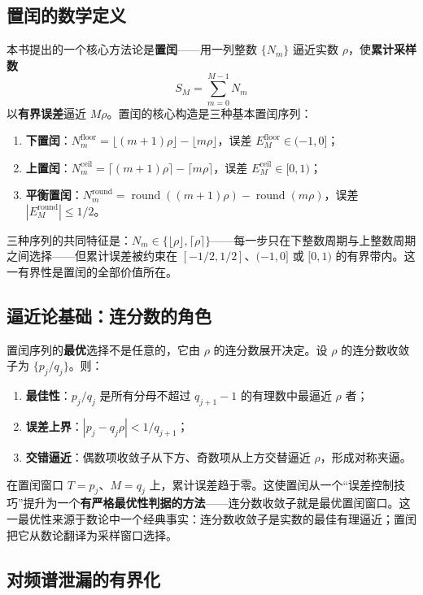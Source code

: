 \subsection*{置闰的数学定义}

本书提出的一个核心方法论是\textbf{置闰}——用一列整数 $\{N_m\}$ 逼近实数 $\rho$，使\textbf{累计采样数}
\[
S_M = \sum_{m=0}^{M-1} N_m
\]
以\textbf{有界误差}逼近 $M\rho$。置闰的核心构造是三种基本置闰序列：
\begin{enumerate}[leftmargin=2em, label={(\arabic*)}]
    \item \textbf{下置闰}：$N_m^{\mathrm{floor}} = \lfloor (m+1)\rho \rfloor - \lfloor m\rho \rfloor$，误差 $E_M^{\mathrm{floor}} \in (-1,0]$；
    \item \textbf{上置闰}：$N_m^{\mathrm{ceil}} = \lceil (m+1)\rho \rceil - \lceil m\rho \rceil$，误差 $E_M^{\mathrm{ceil}} \in [0,1)$；
    \item \textbf{平衡置闰}：$N_m^{\mathrm{round}} = \operatorname{round}((m+1)\rho) - \operatorname{round}(m\rho)$，误差 $|E_M^{\mathrm{round}}| \le 1/2$。
\end{enumerate}
三种序列的共同特征是：$N_m \in \{\lfloor\rho\rfloor, \lceil\rho\rceil\}$——每一步只在下整数周期与上整数周期之间选择——但累计误差被约束在 $[-1/2, 1/2]$、$(-1,0]$ 或 $[0,1)$ 的有界带内。这一有界性是置闰的全部价值所在。

\subsection*{逼近论基础：连分数的角色}

置闰序列的\textbf{最优}选择不是任意的，它由 $\rho$ 的连分数展开决定。设 $\rho$ 的连分数收敛子为 $\{p_j/q_j\}$。则：
\begin{enumerate}[leftmargin=2em, label={(\roman*)}]
    \item \textbf{最佳性}：$p_j/q_j$ 是所有分母不超过 $q_{j+1}-1$ 的有理数中最逼近 $\rho$ 者；
    \item \textbf{误差上界}：$|p_j - q_j\rho| < 1/q_{j+1}$；
    \item \textbf{交错逼近}：偶数项收敛子从下方、奇数项从上方交替逼近 $\rho$，形成对称夹逼。
\end{enumerate}
在置闰窗口 $T = p_j$、$M = q_j$ 上，累计误差趋于零。这使置闰从一个“误差控制技巧”提升为一个\textbf{有严格最优性判据的方法}——连分数收敛子就是最优置闰窗口。这一最优性来源于数论中一个经典事实：连分数收敛子是实数的最佳有理逼近；置闰把它从数论翻译为采样窗口选择。

\subsection*{对频谱泄漏的有界化}

